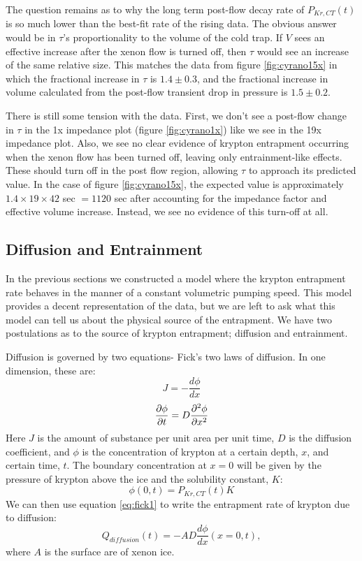 The question remains as to why the long term post-flow decay rate of $P_{Kr,CT}(t)$ is so much lower than the best-fit rate of the rising data. The obvious answer would be in $\tau$'s proportionality to the volume of the cold trap. If $V$ sees an effective increase after the xenon flow is turned off, then $\tau$ would see an increase of the same relative size. This matches the data from figure \ref{fig:cyrano15x} in which the fractional increase in $\tau$ is $1.4\pm0.3$, and the fractional increase in volume calculated from the post-flow transient drop in pressure is $1.5\pm0.2$. 

There is still some tension with the data. First, we don't see a post-flow change in $\tau$ in the 1x impedance plot (figure \ref{fig:cyrano1x}) like we see in the 19x impedance plot. Also, we see no clear evidence of krypton entrapment occurring when the xenon flow has been turned off, leaving only entrainment-like effects. These should turn off in the post flow region, allowing $\tau$ to approach its predicted value. In the case of figure \ref{fig:cyrano15x}, the expected value is approximately $1.4\times19\times 42$ sec $=1120$ sec after accounting for the impedance factor and effective volume increase. Instead, we see no evidence of this turn-off at all.


\subsection{Diffusion and Entrainment}
In the previous sections we constructed a model where the krypton entrapment rate behaves in the manner of a constant volumetric pumping speed. This model provides a decent representation of the data, but we are left to ask what this model can tell us about the physical source of the entrapment. We have two postulations as to the source of krypton entrapment; diffusion and entrainment. 

Diffusion is governed by two equations- Fick's two laws of diffusion. In one dimension, these are:
\begin{equation} \label{eq:fick1}
J = -\frac{d\phi}{dx}
\end{equation}
\begin{equation}\label{eq:fick2}
{\partial \phi \over \partial t} = D \frac{\partial ^{2} \phi}{\partial x ^2}
\end{equation}
Here $J$ is the amount of substance per unit area per unit time, $D$ is the diffusion coefficient, and $\phi$ is the concentration of krypton at a certain depth, $x$, and certain time, $t$. The boundary concentration at $x=0$ will be given by the pressure of krypton above the ice and the solubility constant, $K$:
\begin{equation}
\phi(0,t)=P_{Kr,CT}(t)K
\end{equation}
We can then use equation \ref{eq:fick1} to write the entrapment rate of krypton due to diffusion:
\begin{equation}
Q_{diffusion}(t)=-AD\frac{d\phi}{dx}(x=0,t),
\end{equation}
where $A$ is the surface are of xenon ice.


